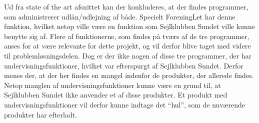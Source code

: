 Ud fra state of the art afsnittet kan der konkluderes, at der findes programmer, som administrerer udlån/udlejning af både.
Specielt ForeningLet har denne funktion, hvilket netop ville være en funktion som Sejlklubben Sundet ville kunne benytte sig af.
Flere af funktionerne, som findes på tværs af de tre programmer, anses for at være relevante for dette projekt, og vil derfor blive taget med videre til problemløsningsdelen.
Dog er der ikke nogen af disse tre programmer, der har undervisningsfunktioner, hvilket var efterspurgt af Sejlklubben Sundet. Derfor menes der, at der her findes en mangel indenfor de produkter, der allerede findes.
Netop manglen af undervisningsfunktioner kunne være en grund til, at Sejlklubben Sundet ikke anvender et af disse produkter.
Et produkt med undervisningsfunktioner vil derfor kunne indtage det ``hul'', som de nuværende produkter har efterladt. 

